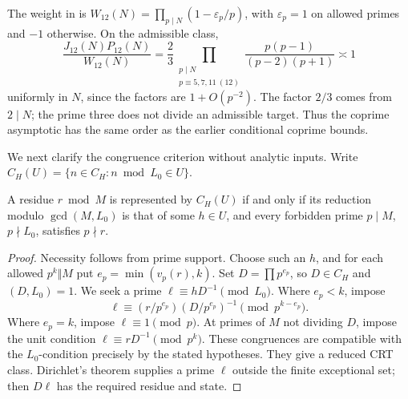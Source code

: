 \begin{remark}
The weight in \cite[Theorem 2]{iwaniecpomykala} is
\(W_{12}(N)=\prod_{p\mid N}(1-\varepsilon_p/p)\), with
\(\varepsilon_p=1\) on allowed primes and \(-1\) otherwise.
On the admissible class,
\[
 \frac{J_{12}(N)P_{12}(N)}{W_{12}(N)}
 =\frac23\prod_{\substack{p\mid N\\p\equiv5,7,11\ (12)}}
                 \frac{p(p-1)}{(p-2)(p+1)}\asymp1
\]
uniformly in \(N\), since the factors are \(1+O(p^{-2})\).
The factor \(2/3\) comes from \(2\mid N\); the prime three does
not divide an admissible target. Thus the coprime asymptotic has
the same order as the earlier conditional coprime bounds.
\end{remark}

We next clarify the congruence criterion without analytic inputs.
Write \(C_H(U)=\{n\in C_H:n\bmod L_0\in U\}\).
\begin{lemma}\label{lem:finite-images}
A residue \(r\bmod M\) is represented by \(C_H(U)\) if and only if
its reduction modulo \(\gcd(M,L_0)\) is that of some \(h\in U\),
and every forbidden prime \(p\mid M\), \(p\nmid L_0\), satisfies
\(p\nmid r\).
\end{lemma}
\begin{proof}
Necessity follows from prime support. Choose such an \(h\), and for
each allowed \(p^k\Vert M\) put \(e_p=\min(v_p(r),k)\).
Set \(D=\prod p^{e_p}\), so \(D\in C_H\) and \((D,L_0)=1\).
We seek a prime \(\ell\equiv hD^{-1}\pmod{L_0}\).
Where \(e_p<k\), impose
\[
 \ell\equiv(r/p^{e_p})(D/p^{e_p})^{-1}\pmod{p^{k-e_p}}.
\]
Where \(e_p=k\), impose \(\ell\equiv1\pmod p\).
At primes of \(M\) not dividing \(D\), impose the unit condition
\(\ell\equiv rD^{-1}\pmod{p^k}\). These congruences are compatible
with the \(L_0\)-condition precisely by the stated hypotheses.
They give a reduced CRT class. Dirichlet's theorem supplies a prime
\(\ell\) outside the finite exceptional set; then \(D\ell\) has
the required residue and state.
\end{proof}

